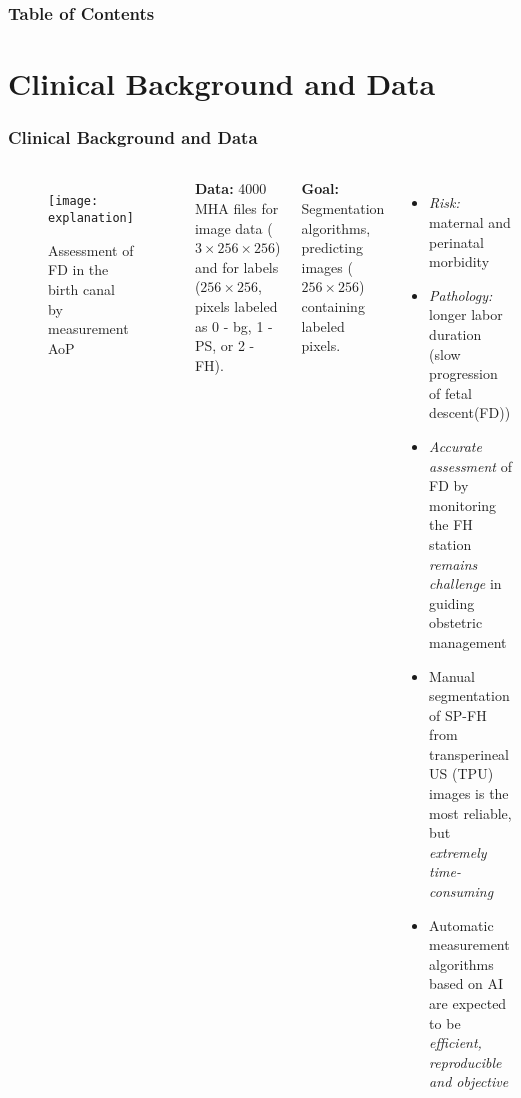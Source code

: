  




\frame{\titlepage}

\begin{frame}
    \frametitle{Table of Contents}
    \tableofcontents
    \end{frame}

\section{Clinical Background and Data}

\begin{frame}
    \frametitle{Clinical Background and Data}
\begin{columns}
    \vspace{-4mm}
    \begin{figure}[H]
        \texttt{[image: explanation]}
        \vspace{-7mm}
        \caption{Assessment of FD in the birth canal by measurement AoP  ~\cite{LU2022107904}}
    \end{figure}
    \small
    \vspace{-5mm}
    \textbf{Data:}
    4000 MHA files for image data ($3\times256\times256$)
    and for labels ($256\times256$, pixels labeled as 
    0 - bg, 1 - PS, or 2 - FH).

    \textbf{Goal:}
    Segmentation algorithms, predicting images ($256\times256$) containing
    labeled pixels.


    \small
    \begin{itemize}
        \item \textit{Risk:} maternal and perinatal morbidity 
        \item \textit{Pathology:} longer labor duration 
        (slow progression of fetal descent(FD))
        \item \textit{Accurate assessment} of FD by 
        monitoring the FH station \textit{remains challenge} 
        in guiding obstetric management
        \item Manual segmentation of SP-FH from transperineal US (TPU)
        images is the most reliable, but \textit{extremely time-consuming} 
        \item Automatic measurement algorithms based on AI are 
        expected to be \textit{efficient, reproducible and objective} ~\cite{10.3389/fphys.2022.940150}
    \end{itemize}
    \end{columns}
\end{frame}



